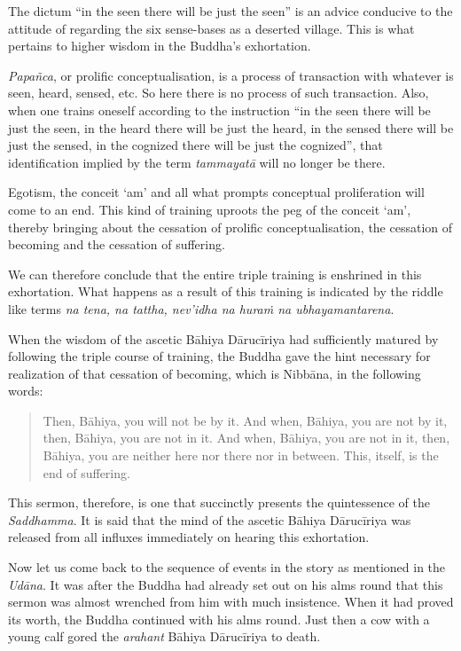 The dictum ``in the seen there will be just the seen'' is an advice conducive to the attitude of regarding the six sense-bases as a deserted village. This is what pertains to higher wisdom in the Buddha's exhortation.

\emph{Papañca}, or prolific conceptualisation, is a process of transaction with whatever is seen, heard, sensed, etc. So here there is no process of such transaction. Also, when one trains oneself according to the instruction ``in the seen there will be just the seen, in the heard there will be just the heard, in the sensed there will be just the sensed, in the cognized there will be just the cognized'', that identification implied by the term \emph{tammayatā} will no longer be there.

Egotism, the conceit `am' and all what prompts conceptual proliferation will come to an end. This kind of training uproots the peg of the conceit `am', thereby bringing about the cessation of prolific conceptualisation, the cessation of becoming and the cessation of suffering.

We can therefore conclude that the entire triple training is enshrined in this exhortation. What happens as a result of this training is indicated by the riddle like terms \emph{na tena, na tattha, nev'idha na huraṁ na ubhayamantarena}.

When the wisdom of the ascetic Bāhiya Dārucīriya had sufficiently matured by following the triple course of training, the Buddha gave the hint necessary for realization of that cessation of becoming, which is Nibbāna, in the following words:

\begin{quote}
Then, Bāhiya, you will not be by it. And when, Bāhiya, you are not by it, then, Bāhiya, you are not in it. And when, Bāhiya, you are not in it, then, Bāhiya, you are neither here nor there nor in between. This, itself, is the end of suffering.
\end{quote}

This sermon, therefore, is one that succinctly presents the quintessence of the \emph{Saddhamma}. It is said that the mind of the ascetic Bāhiya Dārucīriya was released from all influxes immediately on hearing this exhortation.

Now let us come back to the sequence of events in the story as mentioned in the \emph{Udāna}. It was after the Buddha had already set out on his alms round that this sermon was almost wrenched from him with much insistence. When it had proved its worth, the Buddha continued with his alms round. Just then a cow with a young calf gored the \emph{arahant} Bāhiya Dārucīriya to death.

